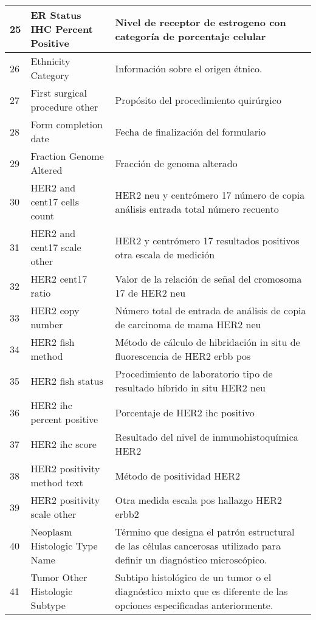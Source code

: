 \begin{table*} [!htb]
	\footnotesize
	\begin{threeparttable}
		\begin{tabular}{p{1cm} p{4cm} p{10cm}}         
			\\ \hline	25	&	ER Status IHC Percent Positive	&	Nivel de receptor de estrogeno con categoría de porcentaje celular
			\\ \hline	26	&	Ethnicity Category	&	Información sobre el origen étnico.
			\\ \hline	27	&	First surgical procedure other	&	Propósito del procedimiento quirúrgico
			\\ \hline	28	&	Form completion date	&	Fecha de finalización del formulario
			\\ \hline	29	&	Fraction Genome Altered	&	Fracción de genoma alterado
			\\ \hline	30	&	HER2 and cent17 cells count	&	HER2 neu y centrómero 17 número de copia análisis entrada total número recuento
			\\ \hline	31	&	HER2 and cent17 scale other	&	HER2 y centrómero 17 resultados positivos otra escala de medición
			\\ \hline	32	&	HER2 cent17 ratio	&	Valor de la relación de señal del cromosoma 17 de HER2 neu
			\\ \hline	33	&	HER2 copy number	&	Número total de entrada de análisis de copia de carcinoma de mama HER2 neu
			\\ \hline	34	&	HER2 fish method	&	Método de cálculo de hibridación in situ de fluorescencia de HER2 erbb pos
			\\ \hline	35	&	HER2 fish status	&	Procedimiento de laboratorio tipo de resultado híbrido in situ HER2 neu
			\\ \hline	36	&	HER2 ihc percent positive	& Porcentaje de HER2 ihc positivo
			\\ \hline	37	&	HER2 ihc score	&	Resultado del nivel de inmunohistoquímica HER2
			\\ \hline	38	&	HER2 positivity method text	&	Método de positividad HER2
			\\ \hline	39	&	HER2 positivity scale other	&	Otra medida escala pos hallazgo HER2 erbb2 
			\\ \hline	40	&	Neoplasm Histologic Type Name	&	Término que designa el patrón estructural de las células cancerosas utilizado para definir un diagnóstico microscópico.
			\\ \hline	41	&	Tumor Other Histologic Subtype	&	Subtipo histológico de un tumor o el diagnóstico mixto que es diferente de las opciones especificadas anteriormente.

\end{tabular}
\end{threeparttable}
\end{table*}
